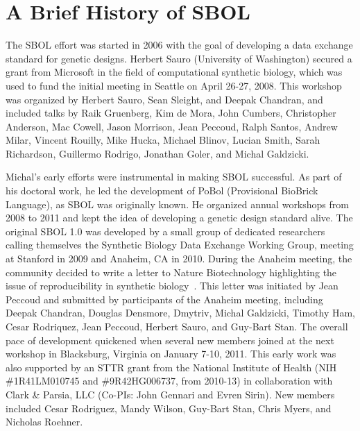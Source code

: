 \section{A Brief History of SBOL}

The SBOL effort was started in 2006 with the goal of developing a data exchange standard for genetic designs. Herbert Sauro (University of Washington) secured a grant from Microsoft in the field of computational synthetic biology, which was used to fund the initial meeting in Seattle on April 26-27, 2008. This workshop was organized by Herbert Sauro, Sean Sleight, and Deepak Chandran, and included talks by Raik Gruenberg, Kim de Mora, John Cumbers,  Christopher Anderson, Mac Cowell, Jason Morrison, Jean Peccoud, Ralph Santos, Andrew Milar, Vincent Rouilly, Mike Hucka, Michael Blinov, Lucian Smith, Sarah Richardson, Guillermo Rodrigo, Jonathan Goler, and Michal Galdzicki. 


Michal's early efforts were instrumental in making SBOL successful. As part of his doctoral work, he led the development of PoBol (Provisional BioBrick Language), as SBOL was originally known. He organized annual workshops from 2008 to 2011 and kept the idea of developing a genetic design standard alive. The original SBOL 1.0 was developed by a small group of dedicated researchers calling themselves the Synthetic Biology Data Exchange Working Group, meeting at Stanford in 2009 and Anaheim, CA in 2010.  During the Anaheim meeting, the community decided to write a letter to Nature Biotechnology highlighting the issue of reproducibility in synthetic biology~\cite{Peccoud2011}. This letter was initiated by Jean Peccoud and submitted by participants of the Anaheim meeting, including Deepak Chandran, Douglas Densmore, Dmytriv, Michal Galdzicki, Timothy Ham, Cesar Rodriquez, Jean Peccoud, Herbert Sauro, and Guy-Bart Stan. The overall pace of development quickened when several new members joined at the next workshop in Blacksburg, Virginia on January 7-10, 2011. This early work was also supported by an STTR grant from the National Institute of Health (NIH \#1R41LM010745 and \#9R42HG006737, from 2010-13) in collaboration with Clark \& Parsia, LLC (Co-PIs: John Gennari and Evren Sirin). New members included Cesar Rodriguez, Mandy Wilson, Guy-Bart Stan, Chris Myers, and Nicholas Roehner.

